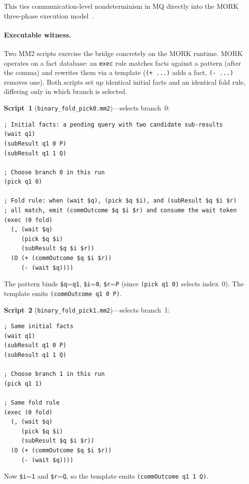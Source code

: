 \documentclass[11pt]{article}
\theoremstyle{definition}
\theoremstyle{remark}
\begin{document}
\noindent
This ties communication-level nondeterminism in MQ directly into the
MORK three-phase execution model~\cite{MeredithStayOSLF2020}.

\paragraph{Executable witness.}
Two MM2 scripts exercise the bridge concretely on the MORK runtime.
MORK operates on a fact database: an \texttt{exec} rule matches facts
against a pattern (after the comma) and rewrites them via a template
(\texttt{(+ ...)} adds a fact, \texttt{(- ...)} removes one).
Both scripts set up identical initial facts and an identical fold rule,
differing only in which branch is selected.

\smallskip\noindent
\textbf{Script~1} (\texttt{binary\_fold\_pick0.mm2})---selects branch~0:

\begin{lstlisting}[caption={Pick outcome 0 (from \texttt{binary\_fold\_pick0.mm2})}]
; Initial facts: a pending query with two candidate sub-results
(wait q1)
(subResult q1 0 P)
(subResult q1 1 Q)

; Choose branch 0 in this run
(pick q1 0)

; Fold rule: when (wait $q), (pick $q $i), and (subResult $q $i $r)
; all match, emit (commOutcome $q $i $r) and consume the wait token
(exec (0 fold)
  (, (wait $q)
     (pick $q $i)
     (subResult $q $i $r))
  (O (+ (commOutcome $q $i $r))
     (- (wait $q))))
\end{lstlisting}

\noindent
The pattern binds \texttt{\$q}=\texttt{q1},
\texttt{\$i}=\texttt{0}, \texttt{\$r}=\texttt{P} (since
\texttt{(pick q1 0)} selects index~0).  The template emits
\texttt{(commOutcome q1 0 P)}.

\smallskip\noindent
\textbf{Script~2} (\texttt{binary\_fold\_pick1.mm2})---selects branch~1:

\begin{lstlisting}[caption={Pick outcome 1 (from \texttt{binary\_fold\_pick1.mm2})}]
; Same initial facts
(wait q1)
(subResult q1 0 P)
(subResult q1 1 Q)

; Choose branch 1 in this run
(pick q1 1)

; Same fold rule
(exec (0 fold)
  (, (wait $q)
     (pick $q $i)
     (subResult $q $i $r))
  (O (+ (commOutcome $q $i $r))
     (- (wait $q))))
\end{lstlisting}

\noindent
Now \texttt{\$i}=\texttt{1} and \texttt{\$r}=\texttt{Q}, so
the template emits \texttt{(commOutcome q1 1 Q)}.
\end{document}
